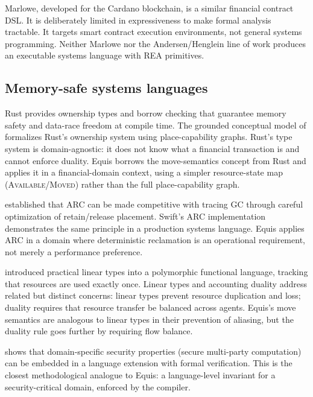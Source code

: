 \documentclass[11pt,a4paper]{article}
\theoremstyle{remark}
\begin{document}
Marlowe, developed for the Cardano blockchain, is a similar financial
contract DSL. It is deliberately limited in expressiveness to make
formal analysis tractable. It targets smart contract execution
environments, not general systems programming. Neither Marlowe nor the
Andersen/Henglein line of work produces an executable systems language
with REA primitives.

\subsection{Memory-safe systems languages}

Rust provides ownership types and borrow checking that guarantee memory
safety and data-race freedom at compile time. The grounded conceptual
model of \citet{crichton_grounded_2023} formalizes Rust's ownership
system using place-capability graphs. Rust's type system is
domain-agnostic: it does not know what a financial transaction is and
cannot enforce duality. Equis borrows the move-semantics concept from
Rust and applies it in a financial-domain context, using a simpler
resource-state map (\textsc{Available}/\textsc{Moved}) rather than the
full place-capability graph.

\citet{ullrich_counting_2021} established that ARC can be made
competitive with tracing GC through careful optimization of
retain/release placement. Swift's ARC implementation
\citep{ungar_dynamic_2017} demonstrates the same principle in a
production systems language. Equis applies ARC in a domain where
deterministic reclamation is an operational requirement, not merely a
performance preference.

\citet{bernardy_linear_2017} introduced practical linear types into a
polymorphic functional language, tracking that resources are used
exactly once. Linear types and accounting duality address related but
distinct concerns: linear types prevent resource duplication and loss;
duality requires that resource transfer be balanced across agents.
Equis's move semantics are analogous to linear types in their
prevention of aliasing, but the duality rule goes further by requiring
flow balance.

\citet{rastogi_wys_2018} shows that domain-specific security properties
(secure multi-party computation) can be embedded in a language
extension with formal verification. This is the closest methodological
analogue to Equis: a language-level invariant for a security-critical
domain, enforced by the compiler.

\end{document}
